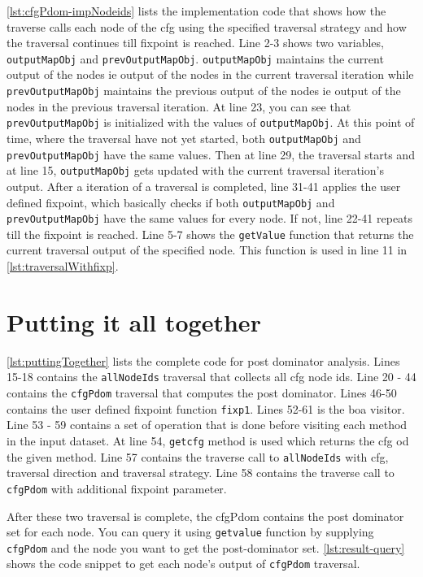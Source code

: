 \ref{lst:cfgPdom-impNodeids} lists the implementation code that shows how the traverse calls each node of the cfg using the specified traversal strategy and how the traversal continues till fixpoint is reached. Line 2-3 shows two variables, \lstinline|outputMapObj| and \lstinline|prevOutputMapObj|. \lstinline|outputMapObj| maintains the current output of the nodes ie output of the nodes in the current traversal iteration while \lstinline|prevOutputMapObj| maintains the previous output of the nodes ie output of the nodes in the previous traversal iteration.
At line 23, you can see that \lstinline|prevOutputMapObj| is initialized with the values of \lstinline|outputMapObj|. At this point of time, where the traversal have not yet started, both \lstinline|outputMapObj| and \lstinline|prevOutputMapObj| have the same values. Then at line 29, the traversal starts and at line 15, \lstinline|outputMapObj| gets updated with the current traversal iteration's output. After a iteration of a traversal is completed, line 31-41 applies the user defined fixpoint, which basically checks if both \lstinline|outputMapObj| and \lstinline|prevOutputMapObj| have the same values for every node. If not, line 22-41 repeats till the fixpoint is reached. Line 5-7 shows the \lstinline|getValue| function that returns the current traversal output of the specified node. This function is used in line 11 in \ref{lst:traversalWithfixp}.

\section{Putting it all together}

\ref{lst:puttingTogether} lists the complete code for post dominator analysis. Lines 15-18 contains the \lstinline|allNodeIds| traversal that collects all cfg node ids. Line 20 - 44 contains the \lstinline|cfgPdom| traversal that computes the post dominator. Lines 46-50 contains the user defined fixpoint function \lstinline|fixp1|. Lines 52-61 is the boa visitor. Line 53 - 59 contains a set of operation that is done before visiting each method in the input dataset. At line 54, \lstinline|getcfg| method is used which returns the cfg od the given method. Line 57 contains the traverse call to \lstinline|allNodeIds| with cfg, traversal direction and traversal strategy. Line 58 contains the traverse call to \lstinline|cfgPdom| with additional fixpoint parameter. 


After these two traversal is complete, the cfgPdom contains the post dominator set for each node. You can query it using \lstinline|getvalue| function by supplying \lstinline|cfgPdom| and the node you want to get the post-dominator set. \ref{lst:result-query} shows the code snippet to get each node's output of \lstinline|cfgPdom| traversal. 